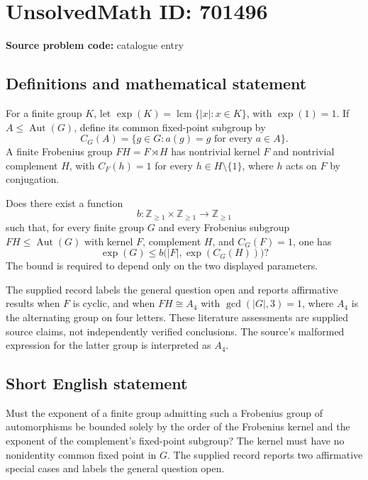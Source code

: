 \documentclass[11pt]{article}
\begin{document}
\section*{UnsolvedMath ID: 701496}
\textbf{Source problem code:} catalogue entry
\subsection{Definitions and mathematical statement}
For a finite group \(K\), let \(\exp(K)=\operatorname{lcm}\{|x|:x\in K\}\), with \(\exp(1)=1\). If \(A\leq\operatorname{Aut}(G)\), define its common fixed-point subgroup by
\[
C_G(A)=\{g\in G:a(g)=g\text{ for every }a\in A\}.
\]
A finite Frobenius group \(FH=F\rtimes H\) has nontrivial kernel \(F\) and nontrivial complement \(H\), with \(C_F(h)=1\) for every \(h\in H\setminus\{1\}\), where \(h\) acts on \(F\) by conjugation.

Does there exist a function
\[
b:\mathbb{Z}_{\geq1}\times\mathbb{Z}_{\geq1}\longrightarrow\mathbb{Z}_{\geq1}
\]
such that, for every finite group \(G\) and every Frobenius subgroup \(FH\leq\operatorname{Aut}(G)\) with kernel \(F\), complement \(H\), and \(C_G(F)=1\), one has
\[
\exp(G)\leq b\bigl(|F|,\exp(C_G(H))\bigr)?
\]
The bound is required to depend only on the two displayed parameters.

The supplied record labels the general question open and reports affirmative results when \(F\) is cyclic, and when \(FH\cong A_4\) with \(\gcd(|G|,3)=1\), where \(A_4\) is the alternating group on four letters. These literature assessments are supplied source claims, not independently verified conclusions. The source's malformed expression for the latter group is interpreted as \(A_4\).
\subsection{Short English statement}
Must the exponent of a finite group admitting such a Frobenius group of automorphisms be bounded solely by the order of the Frobenius kernel and the exponent of the complement's fixed-point subgroup? The kernel must have no nonidentity common fixed point in \(G\). The supplied record reports two affirmative special cases and labels the general question open.
\end{document}
